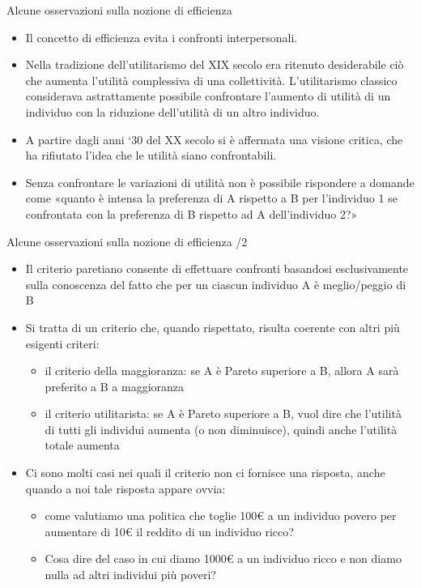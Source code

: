 \documentclass[aspectratio=64,12pt]{beamer}
\begin{document}
\begin{frame}{Alcune osservazioni sulla nozione di efficienza}
\begin{itemize}
\item Il concetto di efficienza evita i confronti interpersonali.
\item Nella tradizione dell’utilitarismo del XIX secolo era ritenuto desiderabile ciò che aumenta l’utilità complessiva di una collettività. L’utilitarismo classico considerava astrattamente possibile confrontare l’aumento di utilità di un individuo con la riduzione dell’utilità di un altro individuo.
\item A partire dagli anni ‘30 del XX secolo si è affermata una visione critica, che ha rifiutato l’idea che le utilità siano confrontabili.
\item Senza confrontare le variazioni di utilità non è possibile rispondere a domande come «quanto è intensa la preferenza di A rispetto a B per l’individuo 1 se confrontata con la preferenza di B rispetto ad A dell’individuo 2?»
\end{itemize}
\end{frame}

\begin{frame}{Alcune osservazioni sulla nozione di efficienza /2}
\begin{itemize}
\item Il criterio paretiano consente di effettuare confronti basandosi esclusivamente sulla conoscenza del fatto che per un ciascun individuo A è meglio/peggio di B
\item Si tratta di un criterio che, quando rispettato, risulta coerente con altri più esigenti criteri:
\begin{itemize}
\item il criterio della maggioranza: se A è Pareto superiore a B, allora A sarà preferito a B a maggioranza
\item il criterio utilitarista: se A è Pareto superiore a B, vuol dire che l’utilità di tutti gli individui aumenta (o non diminuisce), quindi anche l’utilità totale aumenta
\end{itemize}
\item Ci sono molti casi nei quali il criterio non ci fornisce una risposta, anche quando a noi tale risposta appare ovvia:
  \begin{itemize}
  \item come valutiamo una politica che toglie 100€ a un individuo
    povero per aumentare di 10€ il reddito di un individuo ricco?
  \item Cosa dire del caso in cui diamo 1000€ a un individuo ricco e non diamo nulla ad altri individui più poveri?
  \end{itemize}
\end{itemize}
\end{frame}
\end{document}
